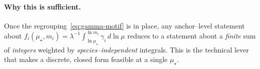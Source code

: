 \documentclass[aps,prd,onecolumn,amsmath,amssymb,superscriptaddress,nofootinbib,showpacs,showkeys]{revtex4-2}
\begin{document}
\paragraph{Why this is sufficient.}
          {\sloppy Once the regrouping~\ref{eq:gamma-motif} is in place, any anchor--level
            statement about $f_i(\mu_\star,m_i)=\lambda^{-1}\!\int_{\ln\mu_\star}^{\ln m_i}\gamma_i\,d\ln\mu$ reduces
            to a statement about a \emph{finite} sum of \emph{integers} weighted
            by \emph{species--independent} integrals. This is the technical lever that makes a discrete,
            closed form feasible at a single $\mu_\star$.}


\end{document}
